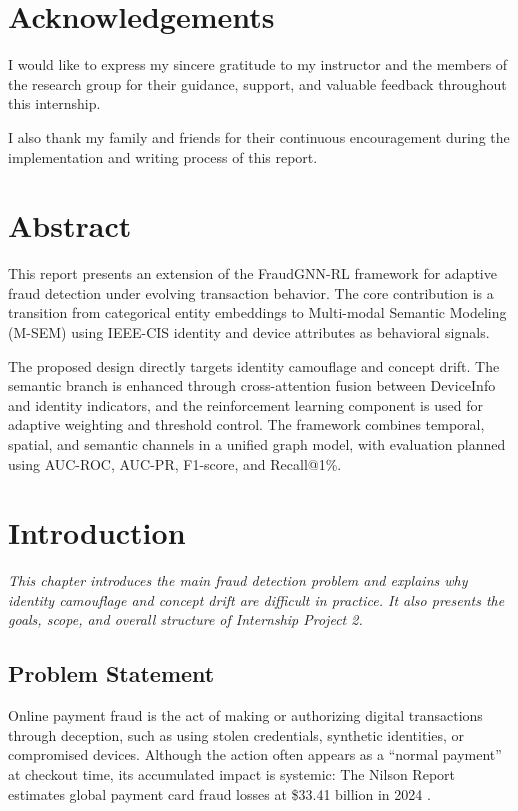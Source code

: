 \documentclass[12pt,a4paper]{report}
\newcommand{\chapterdesc}[1]{%
    \vspace{-0.6\baselineskip}
    \noindent\hspace*{1.5cm}\parbox{\dimexpr\textwidth-1.5cm\relax}{\textit{#1}}
    \par\vspace{0.3\baselineskip}
}
\begin{document}
\clearpage
\chapter*{Acknowledgements}
I would like to express my sincere gratitude to my instructor and the members of the research group for their guidance, support, and valuable feedback throughout this internship.

I also thank my family and friends for their continuous encouragement during the implementation and writing process of this report.

\clearpage
\chapter*{Abstract}
This report presents an extension of the FraudGNN-RL framework for adaptive fraud detection under evolving transaction behavior. The core contribution is a transition from categorical entity embeddings to Multi-modal Semantic Modeling (M-SEM) using IEEE-CIS identity and device attributes as behavioral signals.

The proposed design directly targets identity camouflage and concept drift. The semantic branch is enhanced through cross-attention fusion between DeviceInfo and identity indicators, and the reinforcement learning component is used for adaptive weighting and threshold control. The framework combines temporal, spatial, and semantic channels in a unified graph model, with evaluation planned using AUC-ROC, AUC-PR, F1-score, and Recall@1\%.

\clearpage
\tableofcontents
\listoffigures
\listoftables
\clearpage


\chapter{Introduction}
\chapterdesc{This chapter introduces the main fraud detection problem and explains why identity camouflage and concept drift are difficult in practice. It also presents the goals, scope, and overall structure of Internship Project 2.}

\section{Problem Statement}
Online payment fraud is the act of making or authorizing digital transactions through deception, such as using stolen credentials, synthetic identities, or compromised devices. Although the action often appears as a ``normal payment'' at checkout time, its accumulated impact is systemic: The Nilson Report estimates global payment card fraud losses at \$33.41 billion in 2024 \cite{global_fraud_loss_report}.
\end{document}
